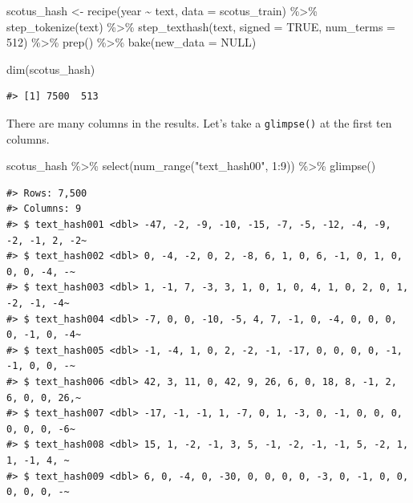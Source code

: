 \documentclass[
]{krantz}
\makeatletter
\newenvironment{Shaded}{\begin{snugshade}}{\end{snugshade}}
\newcommand{\AttributeTok}[1]{\textcolor[rgb]{0.77,0.63,0.00}{#1}}
\newcommand{\ConstantTok}[1]{\textcolor[rgb]{0.00,0.00,0.00}{#1}}
\newcommand{\DecValTok}[1]{\textcolor[rgb]{0.00,0.00,0.81}{#1}}
\newcommand{\FunctionTok}[1]{\textcolor[rgb]{0.00,0.00,0.00}{#1}}
\newcommand{\NormalTok}[1]{#1}
\newcommand{\OtherTok}[1]{\textcolor[rgb]{0.56,0.35,0.01}{#1}}
\newcommand{\SpecialCharTok}[1]{\textcolor[rgb]{0.00,0.00,0.00}{#1}}
\newcommand{\StringTok}[1]{\textcolor[rgb]{0.31,0.60,0.02}{#1}}
\newenvironment{kframe}{%
\medskip{}
\setlength{\fboxsep}{.8em}
 \def\at@end@of@kframe{}%
 \ifinner\ifhmode%
  \def\at@end@of@kframe{\end{minipage}}%
  \begin{minipage}{\columnwidth}%
 \fi\fi%
 \def\FrameCommand##1{\hskip\@totalleftmargin \hskip-\fboxsep
 \colorbox{shadecolor}{##1}\hskip-\fboxsep
     \hskip-\linewidth \hskip-\@totalleftmargin \hskip\columnwidth}%
 \MakeFramed {\advance\hsize-\width
   \@totalleftmargin\z@ \linewidth\hsize
   \@setminipage}}%
 {\par\unskip\endMakeFramed%
 \at@end@of@kframe}
\renewenvironment{Shaded}{\begin{kframe}}{\end{kframe}}
\makeatother
\begin{document}
\begin{Shaded}
\begin{Highlighting}[]
\NormalTok{scotus\_hash }\OtherTok{\textless{}{-}} \FunctionTok{recipe}\NormalTok{(year }\SpecialCharTok{\textasciitilde{}}\NormalTok{ text, }\AttributeTok{data =}\NormalTok{ scotus\_train) }\SpecialCharTok{\%\textgreater{}\%}
  \FunctionTok{step\_tokenize}\NormalTok{(text) }\SpecialCharTok{\%\textgreater{}\%}
  \FunctionTok{step\_texthash}\NormalTok{(text, }\AttributeTok{signed =} \ConstantTok{TRUE}\NormalTok{, }\AttributeTok{num\_terms =} \DecValTok{512}\NormalTok{) }\SpecialCharTok{\%\textgreater{}\%}
  \FunctionTok{prep}\NormalTok{() }\SpecialCharTok{\%\textgreater{}\%}
  \FunctionTok{bake}\NormalTok{(}\AttributeTok{new\_data =} \ConstantTok{NULL}\NormalTok{)}

\FunctionTok{dim}\NormalTok{(scotus\_hash)}
\end{Highlighting}
\end{Shaded}

\begin{verbatim}
#> [1] 7500  513
\end{verbatim}

There are many columns in the results. Let's take a \texttt{glimpse()} at the first ten columns.

\begin{Shaded}
\begin{Highlighting}[]
\NormalTok{scotus\_hash }\SpecialCharTok{\%\textgreater{}\%}
  \FunctionTok{select}\NormalTok{(}\FunctionTok{num\_range}\NormalTok{(}\StringTok{"text\_hash00"}\NormalTok{, }\DecValTok{1}\SpecialCharTok{:}\DecValTok{9}\NormalTok{)) }\SpecialCharTok{\%\textgreater{}\%}
  \FunctionTok{glimpse}\NormalTok{()}
\end{Highlighting}
\end{Shaded}

\begin{verbatim}
#> Rows: 7,500
#> Columns: 9
#> $ text_hash001 <dbl> -47, -2, -9, -10, -15, -7, -5, -12, -4, -9, -2, -1, 2, -2~
#> $ text_hash002 <dbl> 0, -4, -2, 0, 2, -8, 6, 1, 0, 6, -1, 0, 1, 0, 0, 0, -4, -~
#> $ text_hash003 <dbl> 1, -1, 7, -3, 3, 1, 0, 1, 0, 4, 1, 0, 2, 0, 1, -2, -1, -4~
#> $ text_hash004 <dbl> -7, 0, 0, -10, -5, 4, 7, -1, 0, -4, 0, 0, 0, 0, -1, 0, -4~
#> $ text_hash005 <dbl> -1, -4, 1, 0, 2, -2, -1, -17, 0, 0, 0, 0, -1, -1, 0, 0, -~
#> $ text_hash006 <dbl> 42, 3, 11, 0, 42, 9, 26, 6, 0, 18, 8, -1, 2, 6, 0, 0, 26,~
#> $ text_hash007 <dbl> -17, -1, -1, 1, -7, 0, 1, -3, 0, -1, 0, 0, 0, 0, 0, 0, -6~
#> $ text_hash008 <dbl> 15, 1, -2, -1, 3, 5, -1, -2, -1, -1, 5, -2, 1, 1, -1, 4, ~
#> $ text_hash009 <dbl> 6, 0, -4, 0, -30, 0, 0, 0, 0, -3, 0, -1, 0, 0, 0, 0, 0, -~
\end{verbatim}
\end{document}
